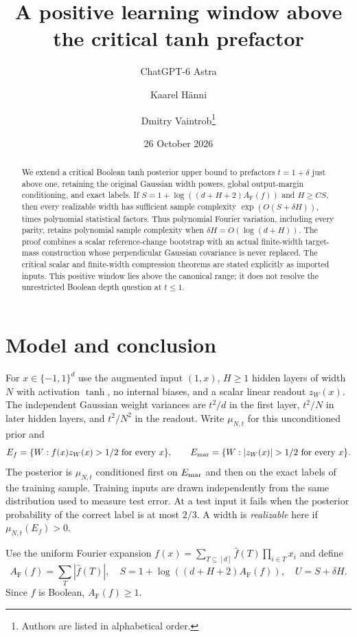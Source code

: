 \documentclass[11pt]{article}
\title{A positive learning window above the critical tanh prefactor}
\author{ChatGPT-6 Astra \and Kaarel H\"anni \and Dmitry Vaintrob\thanks{Authors are listed in alphabetical order.}}
\date{26 October 2026}
\newcommand{\AF}{A_{\mathrm F}}
\begin{document}
\maketitle
\begin{abstract}
We extend a critical Boolean tanh posterior upper bound to prefactors
$t=1+\delta$ just above one, retaining the original Gaussian width
powers, global output-margin conditioning, and exact labels. If
$S=1+\log((d+H+2)\AF(f))$ and $H\ge CS$, then every realizable width has
sufficient sample complexity $\exp(O(S+\delta H))$, times polynomial
statistical factors. Thus polynomial Fourier variation, including every
parity, retains polynomial sample complexity when
$\delta H=O(\log(d+H))$. The proof combines a scalar reference-change
bootstrap with an actual finite-width target-mass construction whose
perpendicular Gaussian covariance is never replaced. The critical
scalar and finite-width compression theorems are stated explicitly as
imported inputs. This positive window lies above the canonical range;
it does not resolve the unrestricted Boolean depth question at $t\le1$.
\end{abstract}

\section{Model and conclusion}
For $x\in\{-1,1\}^d$ use the augmented input $(1,x)$, $H\ge1$
hidden layers of width $N$ with activation $\tanh$, no internal biases,
and a scalar linear readout $z_W(x)$. The independent Gaussian weight
variances are $t^2/d$ in the first layer, $t^2/N$ in later hidden layers,
and $t^2/N^2$ in the readout. Write $\mu_{N,t}$ for this unconditioned
prior and
\[
 E_f=\{W:f(x)z_W(x)>1/2\text{ for every }x\},\qquad
 E_{\rm mar}=\{W:|z_W(x)|>1/2\text{ for every }x\}.
\]
The posterior is $\mu_{N,t}$ conditioned first on $E_{\rm mar}$ and then
on the exact labels of the training sample. Training inputs are drawn
independently from the same distribution used to measure test error.
At a test input it fails
when the posterior probability of the correct label is at most $2/3$.
A width is \emph{realizable} here if $\mu_{N,t}(E_f)>0$.

Use the uniform Fourier expansion
$f(x)=\sum_{T\subseteq[d]}\widehat f(T)\prod_{i\in T}x_i$ and define
\[
 \AF(f)=\sum_T|\widehat f(T)|,\quad
 S=1+\log((d+H+2)\AF(f)),\quad U=S+\delta H.
\]
Since $f$ is Boolean, $\AF(f)\ge1$.
\end{document}
